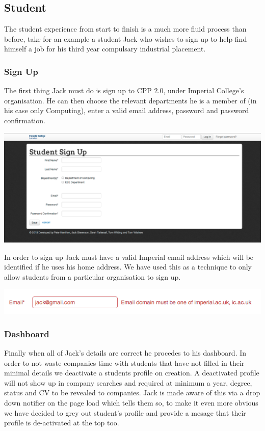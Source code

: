 \subsection{Student}
The student experience from start to finish is a much more fluid process than before, take for an example a student Jack who wishes to sign up to help find himself a job for his third year compulsary industrial placement.
  \subsubsection{Sign Up}
    The first thing Jack must do is sign up to CPP 2.0, under Imperial College's organisation. He can then choose the relevant departments he is a member of (in his case only Computing), enter a valid email address, password and password confirmation.

    \includegraphics[scale=0.3]{images/user_experiences/student/sign_up_page}

    In order to sign up Jack must have a valid Imperial email address which will be identified if he uses his home address. We have used this as a technique to only allow students from a particular organisation to sign up.

    \includegraphics[scale=0.5]{images/user_experiences/student/invalid_email}

  \subsubsection{Dashboard}
    Finally when all of Jack's details are correct he procedes to his dashboard. In order to not waste companies time with students that have not filled in their minimal details we deactivate a students profile on creation. A deactivated profile will not show up in company searches and required at minimum a year, degree, status and CV to be revealed to companies. 
    Jack is made aware of this via a drop down notifier on the page load which tells them so, to make it even more obvious we have decided to grey out student's profile and provide a mesage that their profile is de-activated at the top too.

